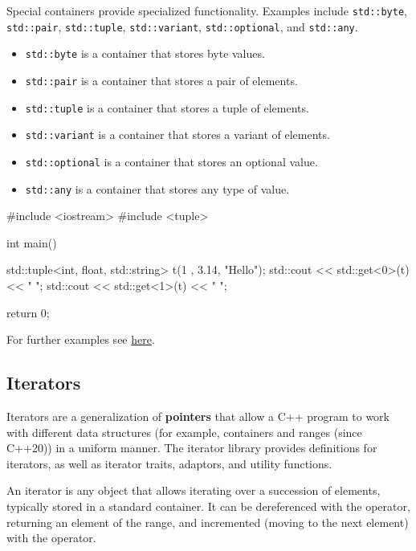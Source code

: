 Special containers provide specialized functionality. Examples include \texttt{std::byte}, \texttt{std::pair}, \texttt{std::tuple}, \texttt{std::variant}, \texttt{std::optional}, and \texttt{std::any}.
\begin{itemize}
    \item \texttt{std::byte} is a container that stores byte values.
    \item \texttt{std::pair} is a container that stores a pair of elements.
    \item \texttt{std::tuple} is a container that stores a tuple of elements.
    \item \texttt{std::variant} is a container that stores a variant of elements.
    \item \texttt{std::optional} is a container that stores an optional value.
    \item \texttt{std::any} is a container that stores any type of value.
\end{itemize}

\begin{exampleblock}
    \begin{codeblock}[language=C++]
#include <iostream>
#include <tuple>

int main() {
    std::tuple<int, float, std::string> t(1
    , 3.14, "Hello");
    std::cout << std::get<0>(t) << " ";
    std::cout << std::get<1>(t) << " ";

    return 0;
}
    \end{codeblock}
\end{exampleblock}

For further examples see \href{https://en.cppreference.com/w/cpp/container}{here}.


\subsection{Iterators} \label{sec:iterators}

Iterators are a generalization of \textbf{pointers} that allow a C++ program to work with different data
structures (for example, containers and ranges (since C++20)) in a uniform manner. The iterator
library provides definitions for iterators, as well as iterator traits, adaptors, and utility functions.

\begin{definitionblock}
    An iterator is any object that allows iterating over a succession of elements, typically stored in a
    standard container. It can be dereferenced with the \plaintt{*} operator, returning an element of the
    range, and incremented (moving to the next element) with the \plaintt{++} operator.
\end{definitionblock}

